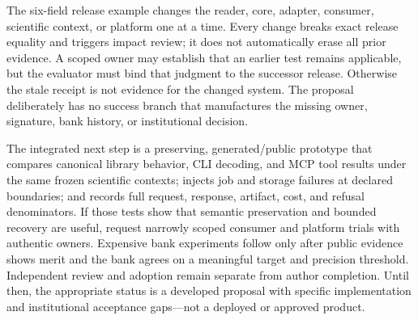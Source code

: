 The six-field release example changes the reader, core, adapter, consumer,
scientific context, or platform one at a time. Every change breaks exact
release equality and triggers impact review; it does not automatically erase
all prior evidence. A scoped owner may establish that an earlier test remains
applicable, but the evaluator must bind that judgment to the successor
release. Otherwise the stale receipt is not evidence for the changed system.
The proposal deliberately has no success branch that manufactures the missing
owner, signature, bank history, or institutional decision.
\citep{exec17_continuity_reference,exec17_continuity_contract}

The integrated next step is a preserving, generated/public prototype that
compares canonical library behavior, CLI decoding, and MCP tool results under
the same frozen scientific contexts; injects job and storage failures at
declared boundaries; and records full request, response, artifact, cost, and
refusal denominators. If those tests show that semantic preservation and
bounded recovery are useful, request narrowly scoped consumer and platform
trials with authentic owners. Expensive bank experiments follow only after
public evidence shows merit and the bank agrees on a meaningful target and
precision threshold. Independent review and adoption remain separate from
author completion. Until then, the appropriate status is a developed proposal
with specific implementation and institutional acceptance gaps—not a
deployed or approved product.
\label{exec17:integration-continuity-end}
